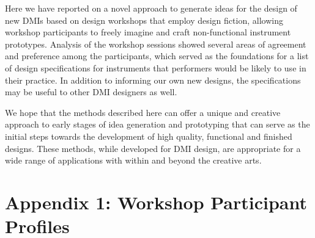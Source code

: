 \documentclass[letterpaper, 12pt]{article}
\begin{document}
Here we have reported on a novel approach to generate ideas for the design of new DMIs based on design workshops that employ design fiction, allowing workshop participants to freely imagine and craft non-functional instrument prototypes.
Analysis of the workshop sessions showed several areas of agreement and preference among the participants, which served as the foundations for a list of design specifications for instruments that performers would be likely to use in their practice. In addition to informing our own new designs, the specifications may be useful to other DMI designers as well. 


We hope that the methods described here can offer a unique and creative approach to early stages of idea generation and prototyping that can serve as the initial steps towards the development of high quality, functional and finished designs. These methods, while developed for DMI design, are appropriate for a wide range of applications with within and beyond the creative arts. 








\section*{Appendix 1: Workshop Participant Profiles}
\end{document}
